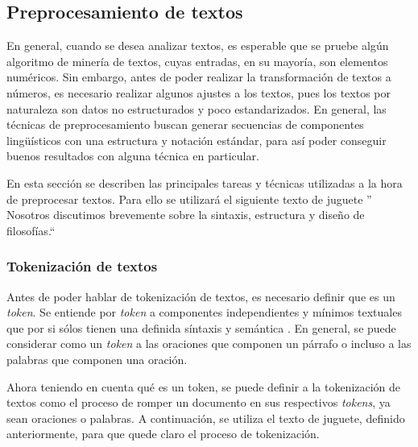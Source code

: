 \subsection{Preprocesamiento de textos}
    En general, cuando se desea analizar textos, es esperable que se pruebe algún algoritmo de minería de textos, cuyas entradas, en su mayoría, son elementos numéricos. Sin embargo, antes de poder realizar la transformación de textos a números, es necesario realizar algunos ajustes a los textos, pues los textos por naturaleza son datos no estructurados y poco estandarizados. En general, las técnicas de preprocesamiento buscan generar secuencias de componentes lingüísticos con una estructura y notación estándar, para así poder conseguir buenos resultados con alguna técnica en particular.
    
    En esta sección se describen las principales tareas y técnicas utilizadas a la hora de preprocesar textos. Para ello se utilizará el siguiente texto de juguete '' Nosotros discutimos brevemente sobre la sintaxis, estructura y diseño de filosofías.``    
\subsubsection{Tokenización de textos}
    Antes de poder hablar de tokenización de textos, es necesario definir que es un \textit{token}. Se entiende por \textit{token} a componentes independientes y mínimos textuales que por si sólos tienen una definida síntaxis y semántica \cite{sarkar2016text}. En general, se puede considerar como un \textit{token} a las oraciones que componen un párrafo o incluso a las palabras que componen una oración. 
    
    Ahora teniendo en cuenta qué es un token, se puede definir a la tokenización de textos como el proceso de romper un documento en sus respectivos \textit{tokens}, ya sean oraciones o palabras. A continuación, se utiliza el texto de juguete, definido anteriormente, para que quede claro el proceso de tokenización.
    
